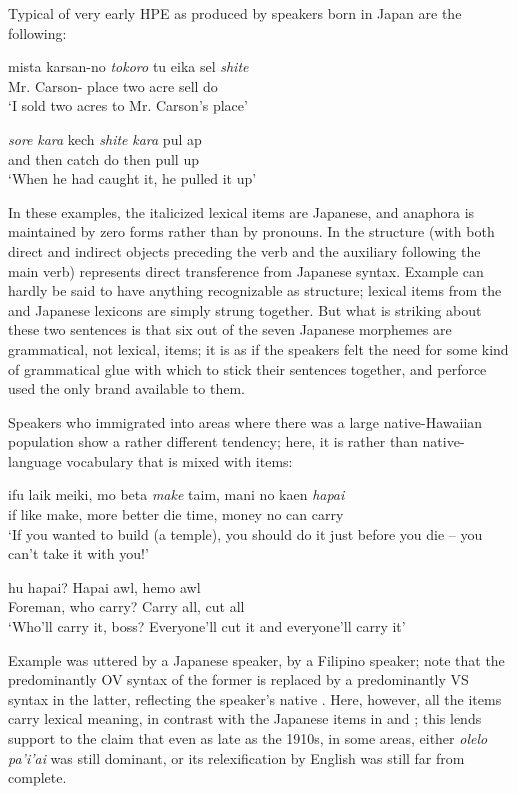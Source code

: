 Typical of very early HPE as produced by speakers born in Japan are the following:

\ea\label{ex:1}
 \gll mista karsan-no \emph{to}\emph{k}\emph{oro} tu eika sel \emph{shite}\\
  Mr. {Carson-\POSS} place two acre sell do \\
\glt  `I sold two acres to Mr. Carson's place'
\z

\ea\label{ex:2}
 \gll \emph{sore} \emph{kara} kech \emph{shite} \emph{kara} pul ap \\
and then catch do then pull up\\
\glt  `When he had caught it, he pulled it up'
\z
{}

\noindent In these examples, the italicized lexical items are Japanese, and ana\-phora is maintained by zero forms rather than by pronouns. In  the structure (with both direct and indirect objects preceding the verb and the auxiliary following the main verb) represents direct transference from Japanese syntax. Example  can hardly be said to have anything recognizable as structure; lexical items from the  and Japanese lexicons are simply strung together. But what is striking about these two sentences is that six out of the seven Japanese morphemes are grammatical, not lexical, items; it is as if the speakers felt the need for some kind of grammatical glue with which to stick their sentences together, and perforce used the only brand available to them.

Speakers who immigrated into areas where there was a large native-Hawaiian population show a rather different tendency; here, it is  rather than native-language vocabulary that is mixed with  items:

\ea\label{ex:3}
 \gll ifu laik meiki, mo beta \emph{make} taim, mani no kaen \emph{hapai} \\
if like make, more better die time, money no can carry \\
\glt  `If you wanted to build (a temple), you should do it just before you die -- you can't take it with you!'
\z

\ea\label{ex:4}
 hu {hapai?} {Hapai} awl, {hemo} awl\\
 Foreman, who {carry?} Carry all, cut all\\
\glt  `Who'll carry it, boss? Everyone'll cut it and everyone'll carry it'
\z

\noindent Example  was uttered by a Japanese speaker,  by a Filipino speaker; note that the predominantly OV syntax of the former is replaced by a predominantly VS syntax in the latter, reflecting the speaker's native . Here, however, all the  items carry lexical meaning, in contrast with the Japanese items in  and ; this lends support to the claim that even as late as the 1910s, in some areas, either \textit{olelo} \textit{pa'i'ai} was still dominant, or its relexification by English was still far from complete.

